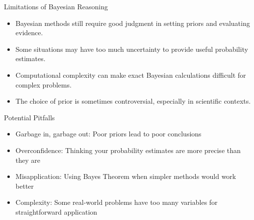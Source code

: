 \documentclass{beamer}
\begin{document}
	\begin{frame}{Limitations of Bayesian Reasoning}
		\begin{itemize}
			\item Bayesian methods still require good judgment in setting priors and evaluating evidence.
			\item Some situations may have too much uncertainty to provide useful probability estimates.
			\item Computational complexity can make exact Bayesian calculations difficult for complex problems.
			\item The choice of prior is sometimes controversial, especially in scientific contexts.
		\end{itemize}
		
		\begin{alertblock}{Potential Pitfalls}
			\scriptsize
			\begin{itemize}
				\item Garbage in, garbage out: Poor priors lead to poor conclusions
				\item Overconfidence: Thinking your probability estimates are more precise than they are
				\item Misapplication: Using Bayes Theorem when simpler methods would work better
				\item Complexity: Some real-world problems have too many variables for straightforward application
			\end{itemize}
		\end{alertblock}
	\end{frame}
	
\end{document}
